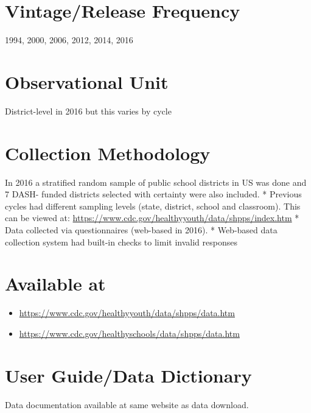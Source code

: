 \documentclass[
]{book}
\providecommand{\tightlist}{%
  \setlength{\itemsep}{0pt}\setlength{\parskip}{0pt}}
\begin{document}
\hypertarget{vintagerelease-frequency-76}{%
\section{Vintage/Release Frequency}\label{vintagerelease-frequency-76}}

1994, 2000, 2006, 2012, 2014, 2016

\hypertarget{observational-unit-76}{%
\section{Observational Unit}\label{observational-unit-76}}

District-level in 2016 but this varies by cycle

\hypertarget{collection-methodology-76}{%
\section{Collection Methodology}\label{collection-methodology-76}}

In 2016 a stratified random sample of public school districts in US was done and 7 DASH- funded districts selected with certainty were also included.
* Previous cycles had different sampling levels (state, district, school and classroom). This can be viewed at: \url{https://www.cdc.gov/healthyyouth/data/shpps/index.htm}
* Data collected via questionnaires (web-based in 2016).
* Web-based data collection system had built-in checks to limit invalid responses

\hypertarget{available-at-76}{%
\section{Available at}\label{available-at-76}}

\begin{itemize}
\tightlist
\item
  \url{https://www.cdc.gov/healthyyouth/data/shpps/data.htm}
\item
  \url{https://www.cdc.gov/healthyschools/data/shpps/data.htm}
\end{itemize}

\hypertarget{user-guidedata-dictionary-76}{%
\section{User Guide/Data Dictionary}\label{user-guidedata-dictionary-76}}

Data documentation available at same website as data download.
\end{document}
